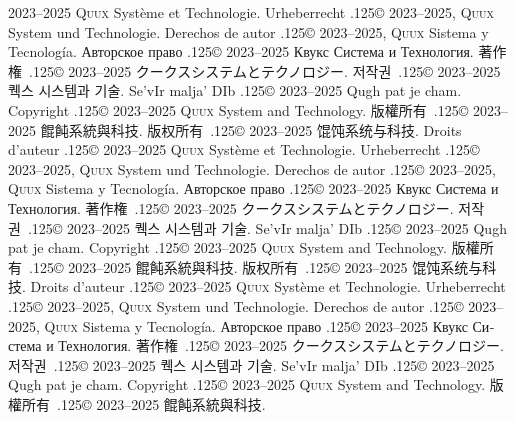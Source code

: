 \documentclass{cookbook}
\begin{document}
	2023--2025 \textsc{Quux} Système et Technologie.
Urheberrecht {\lower.125\baselineskip\hbox{\copyright}} %
	2023--2025, \textsc{Quux} System und Technologie.
Derechos de autor {\lower.125\baselineskip\hbox{\copyright}} %
	2023--2025, \textsc{Quux} Sistema y Tecnología.
\foreignlanguage{russian}{Авторское право} %
	{\lower.125\baselineskip\hbox{\copyright}}
	2023–2025 \foreignlanguage{russian}{Квукс Система и Технология.}
著作権~{\lower.125\baselineskip\hbox{\copyright}}
	2023--2025 クークスシステムとテクノロジー.
저작권~{\lower.125\baselineskip\hbox{\copyright}}
	2023--2025 퀙스 시스템과 기술.
Se'vIr malja' DIb {\lower.125\baselineskip\hbox{\copyright}} %
	2023--2025 Qugh pat je cham.
Copyright {\lower.125\baselineskip\hbox{\copyright}}
	2023--2025 \textsc{Quux} System and Technology.
版權所有~{\lower.125\baselineskip\hbox{\copyright}}
	2023--2025 餛飩系統與科技.
版权所有~{\lower.125\baselineskip\hbox{\copyright}}
	2023--2025 馄饨系统与科技.
Droits d'auteur {\lower.125\baselineskip\hbox{\copyright}} %
	2023--2025 \textsc{Quux} Système et Technologie.
Urheberrecht {\lower.125\baselineskip\hbox{\copyright}} %
	2023--2025, \textsc{Quux} System und Technologie.
Derechos de autor {\lower.125\baselineskip\hbox{\copyright}} %
	2023--2025, \textsc{Quux} Sistema y Tecnología.
\foreignlanguage{russian}{Авторское право} %
	{\lower.125\baselineskip\hbox{\copyright}}
	2023–2025 \foreignlanguage{russian}{Квукс Система и Технология.}
著作権~{\lower.125\baselineskip\hbox{\copyright}}
	2023--2025 クークスシステムとテクノロジー.
저작권~{\lower.125\baselineskip\hbox{\copyright}}
	2023--2025 퀙스 시스템과 기술.
Se'vIr malja' DIb {\lower.125\baselineskip\hbox{\copyright}} %
	2023--2025 Qugh pat je cham.
Copyright {\lower.125\baselineskip\hbox{\copyright}}
	2023--2025 \textsc{Quux} System and Technology.
版權所有~{\lower.125\baselineskip\hbox{\copyright}}
	2023--2025 餛飩系統與科技.
版权所有~{\lower.125\baselineskip\hbox{\copyright}}
	2023--2025 馄饨系统与科技.
Droits d'auteur {\lower.125\baselineskip\hbox{\copyright}} %
	2023--2025 \textsc{Quux} Système et Technologie.
Urheberrecht {\lower.125\baselineskip\hbox{\copyright}} %
	2023--2025, \textsc{Quux} System und Technologie.
Derechos de autor {\lower.125\baselineskip\hbox{\copyright}} %
	2023--2025, \textsc{Quux} Sistema y Tecnología.
\foreignlanguage{russian}{Авторское право} %
	{\lower.125\baselineskip\hbox{\copyright}}
	2023–2025 \foreignlanguage{russian}{Квукс Система и Технология.}
著作権~{\lower.125\baselineskip\hbox{\copyright}}
	2023--2025 クークスシステムとテクノロジー.
저작권~{\lower.125\baselineskip\hbox{\copyright}}
	2023--2025 퀙스 시스템과 기술.
Se'vIr malja' DIb {\lower.125\baselineskip\hbox{\copyright}} %
	2023--2025 Qugh pat je cham.
Copyright {\lower.125\baselineskip\hbox{\copyright}}
	2023--2025 \textsc{Quux} System and Technology.
版權所有~{\lower.125\baselineskip\hbox{\copyright}}
	2023--2025 餛飩系統與科技.
\end{document}
